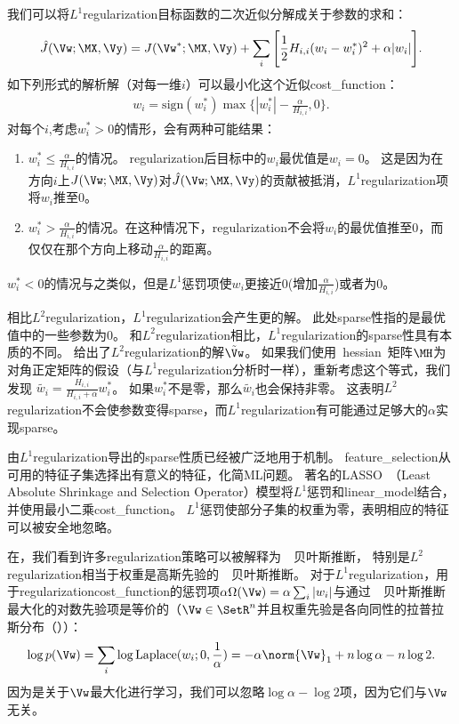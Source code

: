我们可以将$L^1$\gls{regularization}目标函数的二次近似分解成关于参数的求和：
\begin{align}
 \hat J(\Vw; \MX, \Vy) = J(\Vw^*; \MX, \Vy) + \sum_i \Bigg [\frac{1}{2} H_{i,i} (w_i - w_i^*)^2 
 + \alpha |w_i| \Bigg].  %
\end{align}
如下列形式的解析解（对每一维$i$）可以最小化这个近似\gls{cost_function}：
\begin{align}
w_i = \text{sign}(w_i^*) \max\Big\{ |w_i^*| - \frac{\alpha}{H_{i,i}} , 0\Big\} .
\end{align}
对每个$i$,考虑$w_i^* > 0$的情形，会有两种可能结果：
\begin{enumerate}
\item $w_i^* \leq \frac{\alpha}{H_{i,i}}$的情况。
\gls{regularization}后目标中的$w_i$最优值是$w_i = 0$。
这是因为在方向$i$上$J(\Vw; \MX, \Vy) $对$ \hat J(\Vw; \MX, \Vy)$的贡献被抵消，$L^1$\gls{regularization}项将$w_i$推至$0$。
\item  $w_i^* > \frac{\alpha}{H_{i,i}}$的情况。在这种情况下，\gls{regularization}不会将$w_i$的最优值推至0，而仅仅在那个方向上移动$\frac{\alpha}{H_{i,i}}$的距离。
\end{enumerate}
$w_i^* < 0$的情况与之类似，但是$L^1$惩罚项使$w_i$更接近0(增加$ \frac{\alpha}{H_{i,i}}$)或者为0。

相比$L^2$\gls{regularization}，$L^1$\gls{regularization}会产生更的解。
此处\gls{sparse}性指的是最优值中的一些参数为$0$。
和$L^2$\gls{regularization}相比，$L^1$\gls{regularization}的\gls{sparse}性具有本质的不同。
给出了$L^2$\gls{regularization}的解$\tilde \Vw$。 
如果我们使用~\gls{hessian}~矩阵$\MH$为对角正定矩阵的假设（与$L^1$\gls{regularization}分析时一样），重新考虑这个等式，我们发现
$\tilde{w_i} = \frac{H_{i,i}}{H_{i,i} + \alpha} w_i^*$。
如果$w_i^*$不是零，那么$\tilde{w_i}$也会保持非零。 
这表明$L^2$\gls{regularization}不会使参数变得\gls{sparse}，而$L^1$\gls{regularization}有可能通过足够大的$\alpha$实现\gls{sparse}。
 
由$L^1$\gls{regularization}导出的\gls{sparse}性质已经被广泛地用于机制。
\gls{feature_selection}从可用的特征子集选择出有意义的特征，化简\gls{ML}问题。
著名的LASSO~\citep{Tibshirani-1995}（Least Absolute Shrinkage and
Selection Operator）模型将$L^1$惩罚和\gls{linear_model}结合，并使用最小二乘\gls{cost_function}。 
$L^1$惩罚使部分子集的权重为零，表明相应的特征可以被安全地忽略。
 
在，我们看到许多\gls{regularization}策略可以被解释为~~贝叶斯推断，
特别是$L^2$\gls{regularization}相当于权重是高斯先验的~~贝叶斯推断。
对于$L^1$\gls{regularization}，用于\gls{regularization}\gls{cost_function}的惩罚项$\alpha \Omega(\Vw) =  \alpha \sum_i |w_i |$与通过~~贝叶斯推断最大化的对数先验项是等价的（$\Vw \in \SetR^n$并且权重先验是各向同性的拉普拉斯分布（））：
\begin{align}
\log p(\Vw) = \sum_i \log \text{Laplace}(w_i;0,\frac{1}{\alpha}) = 
  -\alpha \norm{\Vw}_1 + n \log \alpha - n \log 2.
\end{align}
因为是关于$\Vw$最大化进行学习，我们可以忽略$\log \alpha - \log 2$项，因为它们与$\Vw$无关。
 
